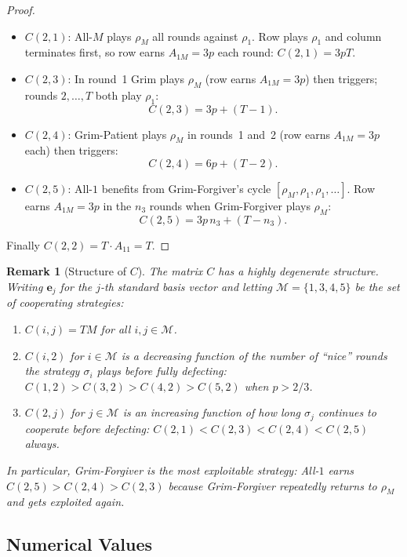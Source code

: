\documentclass[12pt,a4paper]{article}
\newtheorem{remark}{Remark}[section]
\begin{document}
\begin{proof}
\begin{itemize}
\item $C(2,1)$: All-$M$ plays $\rho_M$ all rounds against $\rho_1$.  Row plays
  $\rho_1$ and column terminates first, so row earns $A_{1M}=3p$ each round:
  $C(2,1) = 3pT$.

\item $C(2,3)$: In round~1 Grim plays $\rho_M$ (row earns $A_{1M}=3p$) then
  triggers; rounds $2,\ldots,T$ both play $\rho_1$:
  \[C(2,3) = 3p + (T-1).\]

\item $C(2,4)$: Grim-Patient plays $\rho_M$ in rounds~1 and~2 (row earns $A_{1M}=3p$ each) then triggers:
  \[C(2,4) = 6p + (T-2).\]

\item $C(2,5)$: All-$1$ benefits from Grim-Forgiver's cycle $[\rho_M,\rho_1,\rho_1,\ldots]$.
  Row earns $A_{1M}=3p$ in the $n_3$ rounds when Grim-Forgiver plays $\rho_M$:
  \[C(2,5) = 3p\,n_3 + (T-n_3).\]
\end{itemize}

Finally $C(2,2) = T\cdot A_{11} = T$.
\end{proof}

\begin{remark}[Structure of $C$]\label{rem:structure}
The matrix $C$ has a highly degenerate structure.  Writing $\mathbf{e}_j$ for
the $j$-th standard basis vector and letting $\mathcal{M}=\{1,3,4,5\}$ be the
set of \emph{cooperating} strategies:
\begin{enumerate}
  \item $C(i,j) = TM$ for all $i,j\in\mathcal{M}$.
  \item $C(i,2)$ for $i\in\mathcal{M}$ is a decreasing function of the number
        of ``nice'' rounds the strategy $\sigma_i$ plays before fully defecting:
        $C(1,2) > C(3,2) > C(4,2) > C(5,2)$ when $p > 2/3$.
  \item $C(2,j)$ for $j\in\mathcal{M}$ is an increasing function of how long
        $\sigma_j$ continues to cooperate before defecting:
        $C(2,1) < C(2,3) < C(2,4) < C(2,5)$ always.
\end{enumerate}
In particular, Grim-Forgiver is the most \emph{exploitable} strategy:
All-$1$ earns $C(2,5) > C(2,4) > C(2,3)$ because Grim-Forgiver repeatedly
returns to $\rho_M$ and gets exploited again.
\end{remark}

\subsection{Numerical Values}
\end{document}
